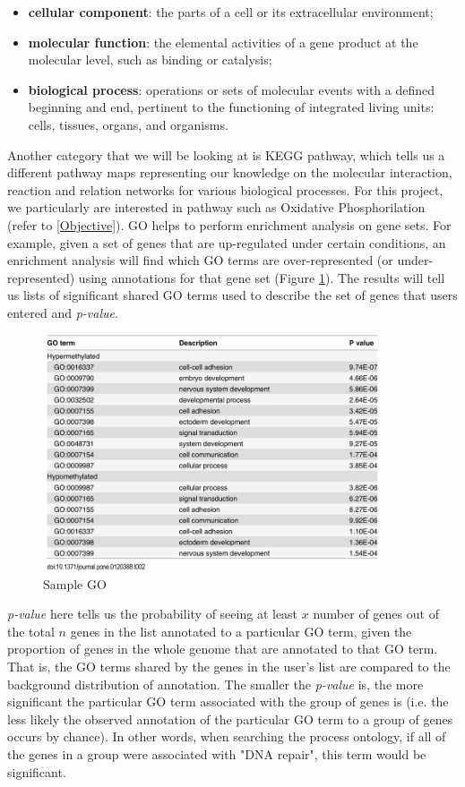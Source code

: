 \begin{itemize}
	\item \textbf{cellular component}: the parts of a cell or its extracellular environment;
	\item \textbf{molecular function}: the elemental activities of a gene product at the molecular level, such as binding or catalysis;
	\item \textbf{biological process}: operations or sets of molecular events with a defined beginning and end, pertinent to the functioning of integrated living units: cells, tissues, organs, and organisms.
\end{itemize}

Another category that we will be looking at is KEGG pathway, which tells us a different pathway maps representing our knowledge on the molecular interaction, reaction and relation networks for various biological processes. For this project, we particularly are interested in pathway such as Oxidative Phosphorilation (refer to \ref{Objective}). GO helps to perform enrichment analysis on gene sets. For example, given a set of genes that are up-regulated under certain conditions, an enrichment analysis will find which GO terms are over-represented (or under-represented) using annotations for that gene set (Figure \ref{fig: GO}). The results will tell us lists of significant shared GO terms used to describe the set of genes that users entered and \textit{p-value}.

\begin{figure}[h!]
	\centering
	\includegraphics[width=100mm,height=70mm ]{Figures/sample_go.png}
	\caption{Sample GO}
	\label{fig: GO}
\end{figure}

\textit{p-value} here tells us the probability of seeing at least $x$ number of genes out of the total $n$ genes in the list annotated to a particular GO term, given the proportion of genes in the whole genome that are annotated to that GO term. That is, the GO terms shared by the genes in the user's list are compared to the background distribution of annotation. The smaller the \textit{p-value} is, the more significant the particular GO term associated with the group of genes is (i.e. the less likely the observed annotation of the particular GO term to a group of genes occurs by chance).  In other words, when searching the process ontology, if all of the genes in a group were associated with "DNA repair", this term would be significant.


